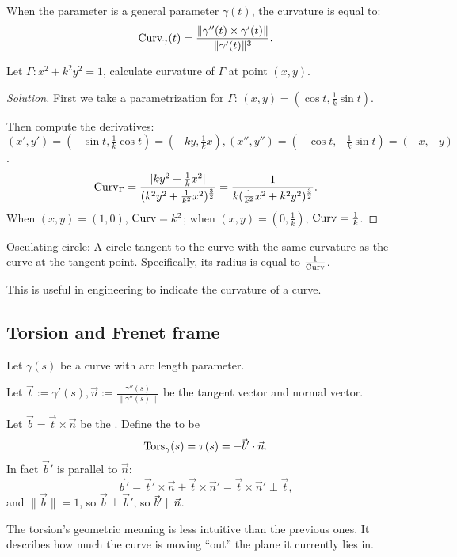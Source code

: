 \begin{proposition}
    When the parameter is a general parameter $\gamma(t)$, the curvature is equal to:
	\[
	\operatorname{Curv}_\gamma(t) = \frac{\lVert\gamma''(t) \times \gamma'(t)\rVert}
	{\lVert\gamma'(t)\rVert^3}.
	\]
\end{proposition}
\begin{example}
    Let $\Gamma: x^2+k^2y^2 = 1$, calculate curvature of $\Gamma$ at point $(x,y)$.
\end{example}
\begin{proof}[Solution]
    First we take a parametrization for $\Gamma$:
	$(x, y) = (\cos t, \frac{1}{k}\sin t)$.

	Then compute the derivatives:
	$(x', y') = (-\sin t, \frac{1}{k}\cos t) = (-ky, \frac{1}{k}x),
	(x'', y'') = (-\cos t,-\frac{1}{k}\sin t) = (-x, -y)$.
	\[
	\operatorname{Curv}_\Gamma = \frac{|ky^2 + \frac{1}{k}x^2|}
	{(k^2y^2+\frac{1}{k^2}x^2)^{\frac{3}{2}}}
	= \frac{1}{k(\frac{1}{k^2}x^2 + k^2y^2)^{\frac{3}{2}}}.
	\]
	When $(x,y)=(1,0)$,  $\operatorname{Curv} = k^2$; when $(x,y)=(0,\frac{1}{k})$,
	$\operatorname{Curv} = \frac{1}{k}$.
\end{proof}
\begin{remark}
    Osculating circle: A circle tangent to the curve with
	the same curvature as the curve at the tangent point.
	Specifically, its radius is equal to $\frac{1}{\operatorname{Curv}}$.

	This is useful in engineering to indicate the curvature
	of a curve.
\end{remark}

\subsection{Torsion and Frenet frame}
\label{sub:Torsion and Frenet frame}
\begin{definition}[Torsion]
	Let $\gamma(s)$ be a curve with arc length parameter.

	Let $\vec{t}:=\gamma'(s), \vec{n}:=\frac{\gamma''(s)}{\lVert\gamma''(s)\rVert}$
	be the tangent vector and normal vector.

	Let $\vec{b} = \vec{t}\times \vec{n}$ be the .
	Define the  to be
	\[
	\operatorname{Tors}_\gamma(s) = \tau(s) = - \vec{b}' \cdot \vec{n}.
	\]
	In fact $\vec{b}'$ is parallel to $\vec{n}$:
	\[
	\vec{b}'= \vec{t}'\times \vec{n} + \vec{t}\times \vec{n}'
	= \vec{t}\times\vec{n}'\perp\vec{t},
	\]
	and $\lVert \vec{b}\rVert = 1$, so $\vec{b}\perp\vec{b}'$,
	so $\vec{b}' \parallel \vec{n}$.
\end{definition}

The torsion's geometric meaning is less intuitive than the previous ones.
It describes how much the curve is moving ``out'' the plane it currently
lies in.
